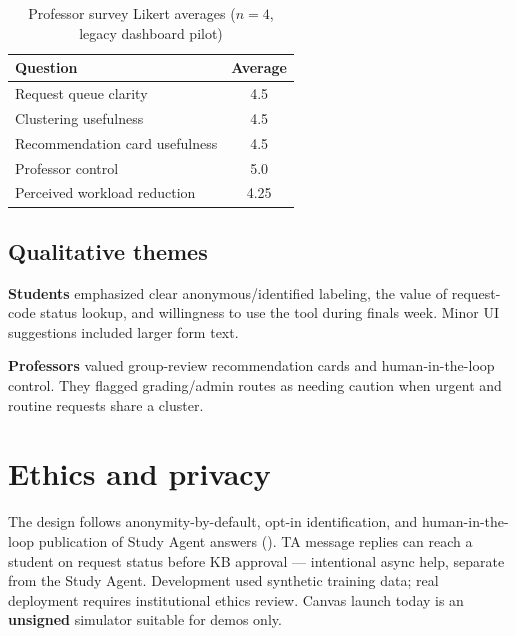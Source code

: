 \documentclass[11pt]{article}
\begin{document}
\begin{table}[htbp]
  \centering
  \caption{Professor survey Likert averages ($n=4$, legacy dashboard pilot)}
  \label{tab:professor-survey}
  \begin{tabular}{@{}lc@{}}
    \toprule
    Question & Average \\
    \midrule
    Request queue clarity & 4.5 \\
    Clustering usefulness & 4.5 \\
    Recommendation card usefulness & 4.5 \\
    Professor control & 5.0 \\
    Perceived workload reduction & 4.25 \\
    \bottomrule
  \end{tabular}
\end{table}

\subsection{Qualitative themes}
\textbf{Students} emphasized clear anonymous/identified labeling, the value of
request-code status lookup, and willingness to use the tool during finals week.
Minor UI suggestions included larger form text.

\textbf{Professors} valued group-review recommendation cards and human-in-the-loop
control. They flagged grading/admin routes as needing caution when urgent and
routine requests share a cluster.

\section{Ethics and privacy}
The design follows anonymity-by-default, opt-in identification, and
human-in-the-loop publication of Study Agent answers
(). TA message replies can reach a student on
request status before KB approval --- intentional async help, separate from the
Study Agent. Development used synthetic training data; real deployment requires
institutional ethics review. Canvas launch today is an \textbf{unsigned}
simulator suitable for demos only.
\end{document}
